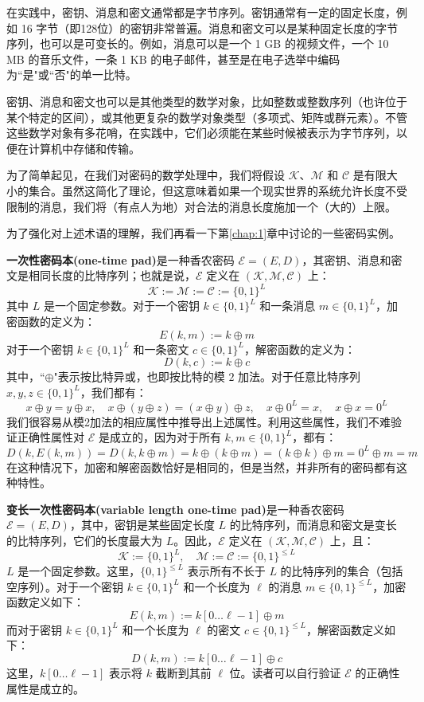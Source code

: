 在实践中，密钥、消息和密文通常都是字节序列。密钥通常有一定的固定长度，例如 16 字节（即128位）的密钥非常普遍。消息和密文可以是某种固定长度的字节序列，也可以是可变长的。例如，消息可以是一个 1 GB 的视频文件，一个 10 MB 的音乐文件，一条 1 KB 的电子邮件，甚至是在电子选举中编码为``是"或``否"的单一比特。

密钥、消息和密文也可以是其他类型的数学对象，比如整数或整数序列（也许位于某个特定的区间），或其他更复杂的数学对象类型（多项式、矩阵或群元素）。不管这些数学对象有多花哨，在实践中，它们必须能在某些时候被表示为字节序列，以便在计算机中存储和传输。

为了简单起见，在我们对密码的数学处理中，我们将假设 $\mathcal{K}$、$\mathcal{M}$ 和 $\mathcal{C}$ 是有限大小的集合。虽然这简化了理论，但这意味着如果一个现实世界的系统允许长度不受限制的消息，我们将（有点人为地）对合法的消息长度施加一个（大的）上限。

为了强化对上述术语的理解，我们再看一下第\ref{chap:1}章中讨论的一些密码实例。

\begin{example}\label{exmp:2-1}
\textbf{一次性密码本(one-time pad)}是一种香农密码 $\mathcal{E}=(E,D)$，其密钥、消息和密文是相同长度的比特序列；也就是说，$\mathcal{E}$ 定义在 $(\mathcal{K},\mathcal{M},\mathcal{C})$ 上：
\[
\mathcal{K}:=\mathcal{M}:=\mathcal{C}:=\{0,1\}^L
\]
其中 $L$ 是一个固定参数。对于一个密钥 $k\in\{0,1\}^L$ 和一条消息 $m\in\{0,1\}^L$，加密函数的定义为：
\[
E(k,m):=k\oplus m
\]
对于一个密钥 $k\in\{0,1\}^L$ 和一条密文 $c\in\{0,1\}^L$，解密函数的定义为：
\[
D(k,c):=k\oplus c
\]
其中，``$\oplus$"表示按比特异或，也即按比特的模 $2$ 加法。对于任意比特序列 $x,y,z\in\{0,1\}^L$，我们都有：
\[
x\oplus y=y\oplus x,
\quad
x\oplus (y\oplus z)=(x\oplus y)\oplus z,
\quad
x\oplus 0^L =x,
\quad
x\oplus x =0^L
\]
我们很容易从模2加法的相应属性中推导出上述属性。利用这些属性，我们不难验证正确性属性对 $\mathcal{E}$ 是成立的，因为对于所有 $k,m\in\{0,1\}^L$，都有：
\[
D(k,E(k,m))=D(k,k\oplus m)=k\oplus (k\oplus m)=(k\oplus k)\oplus m=0^L\oplus m=m
\]
在这种情况下，加密和解密函数恰好是相同的，但是当然，并非所有的密码都有这种特性。
\end{example}

\begin{example}\label{exmp:2-2}
\textbf{变长一次性密码本(variable length one-time pad)}是一种香农密码 $\mathcal{E}=(E,D)$，其中，密钥是某些固定长度 $L$ 的比特序列，而消息和密文是变长的比特序列，它们的长度最大为 $L$。因此，$\mathcal{E}$ 定义在 $(\mathcal{K},\mathcal{M},\mathcal{C})$ 上，且：
\[
\mathcal{K}:=\{0,1\}^L,
\quad
\mathcal{M}:=\mathcal{C}:=\{0,1\}^{\leq L}
\]
$L$ 是一个固定参数。这里，$\{0,1\}^{\leq L}$ 表示所有不长于 $L$ 的比特序列的集合（包括空序列）。对于一个密钥 $k\in\{0,1\}^L$ 和一个长度为 $\ell$ 的消息 $m\in\{0,1\}^{\leq L}$，加密函数定义如下：
\[
E(k,m):=k[0\dots\ell-1]\oplus m
\]
而对于密钥 $k\in\{0,1\}^L$ 和一个长度为 $\ell$ 的密文 $c\in\{0,1\}^{\leq L}$，解密函数定义如下：
\[
D(k,m):=k[0\dots\ell-1]\oplus c
\]
这里，$k[0\dots\ell-1]$ 表示将 $k$ 截断到其前 $\ell$ 位。读者可以自行验证 $\mathcal{E}$ 的正确性属性是成立的。
\end{example}

